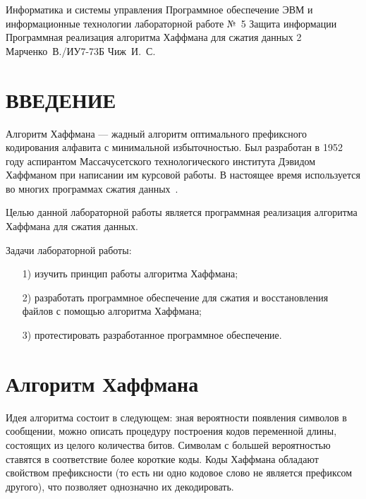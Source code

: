 \documentclass{bmstu}
\begin{document}
\makereporttitle
    {Информатика и системы управления}
    {Программное обеспечение ЭВМ и информационные технологии}
    {лабораторной работе №~5}
    {Защита информации}
    {Программная реализация алгоритма Хаффмана для сжатия данных}
    {2}
    {Марченко~В./ИУ7-73Б}
    {Чиж~И.~С.}

{\centering \maketableofcontents}

{\centering \chapter*{ВВЕДЕНИЕ}}

Алгоритм Хаффмана --- жадный алгоритм оптимального префиксного кодирования алфавита с минимальной избыточностью. 
Был разработан в 1952 году аспирантом Массачусетского технологического института Дэвидом Хаффманом при написании им курсовой работы. 
В настоящее время используется во многих программах сжатия данных~\cite{HuffmanCode}.

Целью данной лабораторной работы является программная реализация алгоритма Хаффмана для сжатия данных.

Задачи лабораторной работы:
\begin{enumerate}
\item[1)] изучить принцип работы алгоритма Хаффмана;
\item[2)] разработать программное обеспечение для сжатия и восстановления файлов с помощью алгоритма Хаффмана;
\item[3)] протестировать разработанное программное обеспечение.
\end{enumerate}

\chapter{Алгоритм Хаффмана}

Идея алгоритма состоит в следующем: зная вероятности появления символов в сообщении, можно описать процедуру построения кодов переменной длины, состоящих из целого количества битов. 
Символам с большей вероятностью ставятся в соответствие более короткие коды. 
Коды Хаффмана обладают свойством префиксности (то есть ни одно кодовое слово не является префиксом другого), что позволяет однозначно их декодировать.
\end{document}
